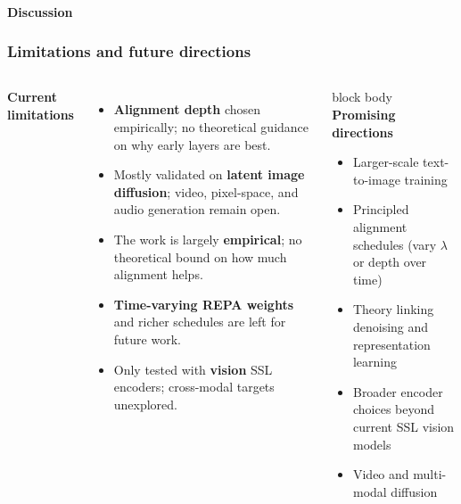 \begin{frame}[t]
  \framesubtitle{Discussion}
  \frametitle{Limitations and future directions}
  \begin{columns}[T,totalwidth=\textwidth]
    \textbf{Current limitations}
    \begin{itemize}
      \item \textbf{Alignment depth} chosen empirically; no theoretical
            guidance on why early layers are best.
      \item Mostly validated on \textbf{latent image diffusion};
            video, pixel-space, and audio generation remain open.
      \item The work is largely \textbf{empirical}; no theoretical bound
            on how much alignment helps.
      \item \textbf{Time-varying REPA weights} and richer schedules
            are left for future work.
      \item Only tested with \textbf{vision} SSL encoders; cross-modal
            targets unexplored.
    \end{itemize}
    \begin{beamercolorbox}[wd=\linewidth,rounded=true,sep=0.22cm]{block body}
      \textbf{Promising directions}
      \begin{itemize}
        \item Larger-scale text-to-image training
        \item Principled alignment schedules
              (vary \(\lambda\) or depth over time)
        \item Theory linking denoising and
              representation learning
        \item Broader encoder choices beyond
              current SSL vision models
        \item Video and multi-modal diffusion
      \end{itemize}
    \end{beamercolorbox}
    \vspace{0.18cm}
  \end{columns}
\end{frame}
